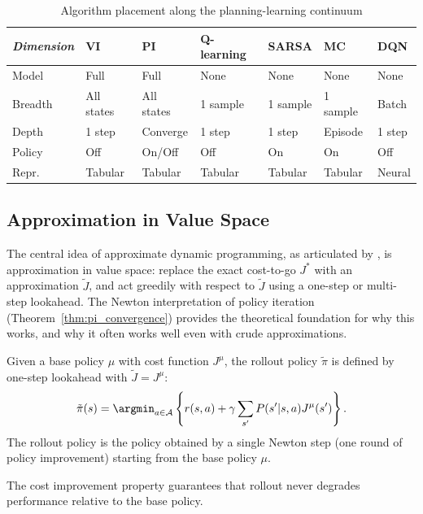 \begin{table}[h!]
\centering
\caption{Algorithm placement along the planning-learning continuum}
\label{tab:algorithm-comparison}
\begin{tabular}{p{2.0cm}|p{1.5cm}p{1.5cm}p{1.5cm}p{1.5cm}p{1.5cm}p{1.5cm}}
\hline
\textit{Dimension} & VI & PI & Q-learning & SARSA & MC & DQN \\
\hline
Model & Full & Full & None & None & None & None \\
\hline
Breadth & All states & All states & 1 sample & 1 sample & 1 sample & Batch \\
\hline
Depth & 1 step & Converge & 1 step & 1 step & Episode & 1 step \\
\hline
Policy & Off & On/Off & Off & On & On & Off \\
\hline
Repr. & Tabular & Tabular & Tabular & Tabular & Tabular & Neural \\
\hline
\end{tabular}
\end{table}


\subsection{Approximation in Value Space}
\label{sec:approx_value_space}

The central idea of approximate dynamic programming, as articulated by \citet{bertsekas2022,bertsekas2024,bertsekas2025}, is approximation in value space: replace the exact cost-to-go $J^*$ with an approximation $\tilde{J}$, and act greedily with respect to $\tilde{J}$ using a one-step or multi-step lookahead. The Newton interpretation of policy iteration (Theorem~\ref{thm:pi_convergence}) provides the theoretical foundation for why this works, and why it often works well even with crude approximations.

\begin{definition}
\label{def:rollout}
Given a base policy $\mu$ with cost function $J^\mu$, the rollout policy $\tilde{\pi}$ is defined by one-step lookahead with $\tilde{J} = J^\mu$:
\[
\tilde{\pi}(s) = \argmin_{a \in \mathcal{A}} \left\{ r(s,a) + \gamma \sum_{s'} P(s'|s,a) J^\mu(s') \right\}.
\]
The rollout policy is the policy obtained by a single Newton step (one round of policy improvement) starting from the base policy $\mu$.
\end{definition}

The cost improvement property guarantees that rollout never degrades performance relative to the base policy.

